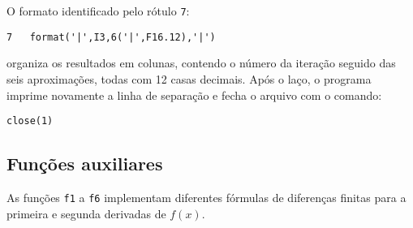 O formato identificado pelo rótulo \texttt{7}:

\vspace*{1\baselineskip}
\begin{lstlisting}
7   format('|',I3,6('|',F16.12),'|')
\end{lstlisting}

\noindent
organiza os resultados em colunas, contendo o número da iteração 
seguido das seis aproximações, todas com 12 casas decimais.  
Após o laço, o programa imprime novamente a linha de separação 
e fecha o arquivo com o comando:

\vspace*{1\baselineskip}
\begin{lstlisting}
close(1)
\end{lstlisting}

\subsection*{Funções auxiliares}

As funções \texttt{f1} a \texttt{f6} implementam diferentes fórmulas 
de diferenças finitas para a primeira e segunda derivadas de $f(x)$.

